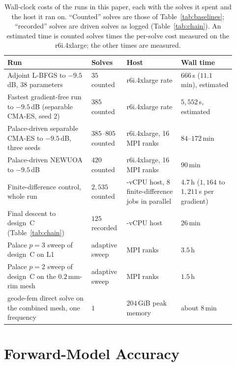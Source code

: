 \documentclass{anvil-paper}
\begin{document}
\begin{table}[t]
  \centering
  \caption{Wall-clock costs of the runs in this paper, each with the solves
  it spent and the host it ran on. ``Counted'' solves are those of
  Table~\ref{tab:baselines}; ``recorded'' solves are driven solves as logged
  (Table~\ref{tab:chain}). An estimated time is counted solves times the
  per-solve cost measured on the r6i.4xlarge; the other times are measured.}
  \label{tab:cost}
  \footnotesize
  \setlength{\tabcolsep}{4pt}
  \begin{tabular}{@{}>{\raggedright\arraybackslash}p{0.34\linewidth}>{\raggedright\arraybackslash}p{0.14\linewidth}>{\raggedright\arraybackslash}p{0.22\linewidth}>{\raggedright\arraybackslash}p{0.22\linewidth}@{}}
    \toprule
    Run & Solves & Host & Wall time \\
    \midrule
    Adjoint L-BFGS to $-9.5$\,dB, 38 parameters & $35$ counted & r6i.4xlarge rate & $666$\,s ($11.1$\,min), estimated \\
    Fastest gradient-free run to $-9.5$\,dB (separable CMA-ES, seed 2) & $385$ counted & r6i.4xlarge rate & $5{,}552$\,s, estimated \\
    Palace-driven separable CMA-ES to $-9.5$\,dB, three seeds & $385$--$805$ counted & r6i.4xlarge, 16 MPI ranks & $84$--$172$\,min \\
    Palace-driven NEWUOA to $-9.5$\,dB & $420$ counted & r6i.4xlarge, 16 MPI ranks & $90$\,min \\
    Finite-difference control, whole run & $2{,}535$ counted & 16-vCPU host, 8 finite-difference jobs in parallel & $4.7$\,h ($1{,}164$ to $1{,}211$\,s per gradient) \\
    Final descent to design~C (Table~\ref{tab:chain}) & $125$ recorded & 32-vCPU host & $26$\,min \\
    Palace $p = 3$ sweep of design~C on L1 & adaptive sweep & 16 MPI ranks & $3.5$\,h \\
    Palace $p = 2$ sweep of design~C on the $0.2$\,mm-rim mesh & adaptive sweep & 16 MPI ranks & $1.5$\,h \\
    geode-fem direct solve on the combined mesh, one frequency & $1$ & $204$\,GiB peak memory & about $8$\,min \\
    \bottomrule
  \end{tabular}
\end{table}

\section{Forward-Model Accuracy}
\label{sec:accuracy}
\end{document}
